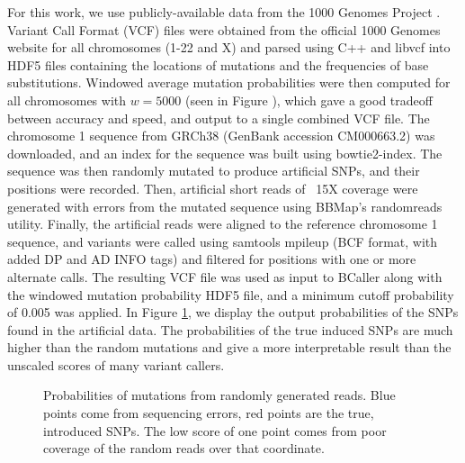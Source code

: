 \documentclass[10pt,letterpaper]{article}
\begin{document}
For this work, we use publicly-available data from the 1000 Genomes Project \cite{5}. Variant Call Format (VCF) files were obtained from the official 1000 Genomes website for all chromosomes (1-22 and X) and parsed
using C++ and libvcf into HDF5 files containing the locations of mutations and the frequencies of base substitutions. Windowed average mutation probabilities were then computed for all chromosomes with $w = 5000$ (seen in Figure \cite{fig:windowprobs}),
which gave a good tradeoff between accuracy and speed, and output to a single combined VCF file. The chromosome 1 sequence from GRCh38 (GenBank accession CM000663.2) was downloaded, and an index for the sequence was built using bowtie2-index. The
sequence was then randomly mutated to produce artificial SNPs, and their positions were recorded. Then, artificial short reads of ~15X coverage were generated with errors from the mutated sequence using BBMap's randomreads
utility. Finally, the artificial reads were aligned to the reference chromosome 1 sequence, and variants were called using samtools mpileup (BCF format, with added DP and AD INFO tags) and filtered for positions
with one or more alternate calls. The resulting VCF file was used as input to BCaller along with the windowed mutation probability HDF5 file, and a minimum cutoff probability of 0.005 was applied. In Figure \ref{fig:outputprobs},
we display the output probabilities of the SNPs found in the artificial data. The probabilities of the true induced SNPs are much higher than the random mutations and give a more interpretable result than the unscaled scores
of many variant callers.

\begin{figure}[h]
\begin{center}
\end{center}
   \caption{\small Probabilities of mutations from randomly generated reads. Blue points come from sequencing errors, red points are the true, introduced SNPs. The low score of one point comes from poor coverage of the random reads over that coordinate.}
\label{fig:outputprobs}
\end{figure}
\end{document}
